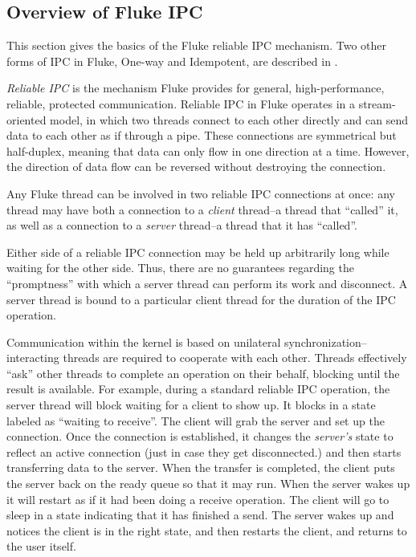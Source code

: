 \subsection{Overview of Fluke IPC}

This section gives the basics of the Fluke reliable IPC mechanism.
Two other forms of IPC in Fluke, One-way and Idempotent, are
described in \cite{Flukedocs:96}.

{\em Reliable IPC} is the mechanism Fluke provides
for general, high-performance, reliable, protected communication.
Reliable IPC in Fluke operates in a stream-oriented model,
in which two threads connect to each other directly
and can send data to each other as if through a pipe.
These connections are symmetrical but half-duplex,
meaning that data can only flow in one direction at a time.
However, the direction of data flow can be reversed
without destroying the connection.

Any Fluke thread can be involved in two reliable IPC connections at once:
any thread may have both a connection to a {\em client}
thread--a thread that ``called'' it,
as well as a connection to a {\em server} 
thread--a thread that it has ``called''.

Either side of a reliable IPC connection
may be held up arbitrarily long while waiting for the other side.
Thus, there are no guarantees regarding the ``promptness''
with which a server thread can perform its work and disconnect.
A server thread is bound to a particular client thread
for the duration of the IPC operation.

Communication within the kernel is based on unilateral
synchronization--interacting threads are required to cooperate with
each other.
Threads effectively ``ask'' other threads to complete an operation
on their behalf, blocking until the result is available.  For example,
during a standard reliable IPC operation, the server thread will
block waiting for a client to show up.  It blocks in 
a state labeled as ``waiting to receive''.  The client will 
grab the server and set up the connection.  Once the connection is
established, it changes the {\em server's} state to reflect an
active connection (just in case they get disconnected.) and then
starts transferring data to the server.  When the transfer is 
completed, the client puts the server back on the ready queue so
that it may run.  When the server wakes up it will restart as
if it had been doing a receive operation. The client will go
to sleep in a state indicating that it has finished a send.  The
server wakes up and notices the client is in the right state,
and then restarts the client, and returns to the user itself.

